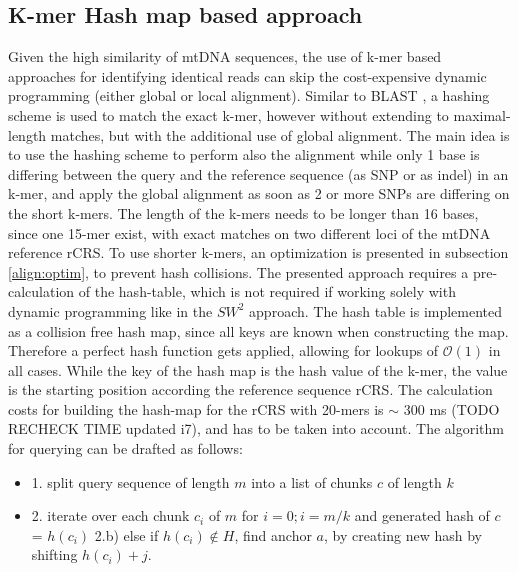 \subsection{K-mer Hash map based approach}
Given the high similarity of mtDNA sequences, the use of k-mer based approaches for identifying identical reads can skip the cost-expensive dynamic programming (either global or local alignment). Similar to BLAST \cite{Altschul1990}, a hashing scheme is used to match the exact k-mer, however without extending to maximal-length matches, but with the additional use of global alignment. The main idea is to use the hashing scheme to perform also the alignment while only 1 base is differing between the query and the reference sequence (as SNP or as indel) in an k-mer, and apply the global alignment as soon as 2 or more SNPs are differing on the short k-mers. The length of the k-mers needs to be longer than 16 bases, since one 15-mer exist, with exact matches on two different loci of the mtDNA reference rCRS. To use shorter k-mers, an optimization is presented in subsection \ref{align:optim}, to prevent hash collisions.
The presented approach requires a pre-calculation of the hash-table, which is not required if working solely with dynamic programming like in the $SW^{2}$ approach.
The hash table is implemented as a collision free hash map, since all keys are known when constructing the map. Therefore a perfect hash function gets applied, allowing for lookups of $\mathcal{O}(1)$ in all cases. While the key of the hash map is the hash value of the k-mer, the value is the starting position according the reference sequence rCRS. The calculation costs for building the hash-map for the rCRS with 20-mers is $\sim$ 300 ms (TODO RECHECK TIME updated i7), and has to be taken into account.
The algorithm for querying can be drafted as follows:
\begin{itemize}
\item 1. split query sequence of length $m$ into a list of chunks $c$ of length $k$
\item 2. iterate over each chunk $c_i$ of $m$ for $i=0; i= m/k$ and generated hash of $c$ = $h(c_i)$
\subitem 2.b) else if $h(c_i) \notin H$, find anchor $a$, by creating new hash by shifting    $h(c_i)+j$. 
\end{itemize}
